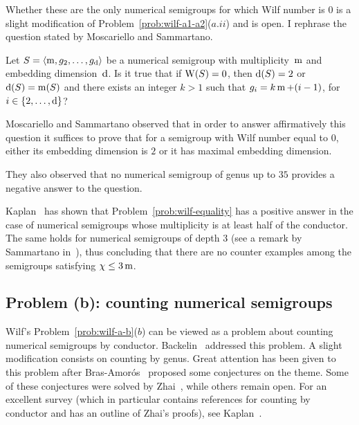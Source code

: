 Whether these are the only numerical semigroups for which Wilf number is $0$ is a slight modification of Problem~\ref{prob:wilf-a1-a2}($a.ii$) and is open. I rephrase the question stated by  Moscariello and Sammartano.

\begin{problem}\label{prob:wilf-equality}
	\label{quest:W-equal-0}
	Let $S=\langle \operatorname{m}, g_2,\ldots,g_{\operatorname{d}}\rangle$ be a numerical semigroup with multiplicity~$\operatorname{m}$ and embedding dimension~$\operatorname{d}$. Is it true that if $\operatorname{W}(S)=0$, then $\operatorname{d}(S)=2$ or $\operatorname{d}(S)=\operatorname{m}(S)$ and there exists an integer $k>1$ such that $g_i=k\operatorname{m}+(i-1)$, for $i\in\{2,\ldots,\operatorname{d}\}$? 
\end{problem}

Moscariello and Sammartano observed that in order to answer affirmatively this question it suffices to prove that for a semigroup with Wilf number equal to $0$, either its embedding dimension is $2$ or it has maximal embedding dimension.

They also observed that no numerical semigroup of genus up to $35$ provides a negative answer to the question.

Kaplan~\cite[Prop.~26]{Kaplan2012JPAA-Counting} has shown that Problem~\ref{prob:wilf-equality} has a positive answer in the case of numerical semigroups whose multiplicity is at least half of the conductor. The same holds for numerical semigroups of depth $3$ (see a remark by Sammartano in~\cite[Rem.~6.6]{Eliahou2018JEMS-Wilfs}), thus concluding that there are no counter examples among the semigroups satisfying $\operatorname{\chi}\le 3\operatorname{m}$.

\subsection{Problem (b): counting numerical semigroups}

Wilf's Problem~\ref{prob:wilf-a-b}($b$) can be viewed as a problem about counting numerical semigroups by conductor. Backelin~\cite{Backelin1990MS-number} addressed this problem. A slight modification consists on counting by genus. Great attention has been given to this problem after Bras-Amorós~\cite{Bras-Amoros2008SF-Fibonacci} proposed some conjectures on the theme. Some of these conjectures were solved by Zhai~\cite{Zhai2012SF-Fibonacci}, while others remain open.
For an excellent survey (which in particular contains references for counting by conductor and has an outline of Zhai's proofs), see Kaplan~\cite{Kaplan2017AMM-Counting}.

